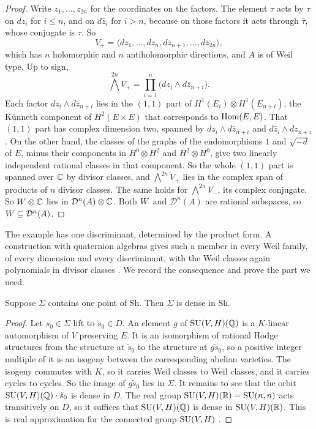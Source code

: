 \begin{proof}
Write $z_{1},\dots,z_{2n}$ for the coordinates on the factors. The element
$\tau$ acts by $\tau$ on $dz_{i}$ for $i\le n$, and on $d\bar z_{i}$ for
$i>n$, because on those factors it acts through $\bar\tau$, whose conjugate
is $\tau$. So
\[
  V_{+}=\langle dz_{1},\dots,dz_{n},d\bar z_{n+1},\dots,d\bar z_{2n}\rangle,
\]
which has $n$ holomorphic and $n$ antiholomorphic directions, and $A$ is of
Weil type. Up to sign,
\[
  \textstyle\bigwedge^{2n}V_{+}=\prod_{i=1}^{n}\bigl(dz_{i}\wedge d\bar z_{n+i}\bigr).
\]
Each factor $dz_{i}\wedge d\bar z_{n+i}$ lies in the $(1,1)$ part of
$H^{1}(E_{i})\otimes H^{1}(E_{n+i})$, the Künneth component of
$H^{2}(E\times E)$ that corresponds to $\operatorname{Hom}(E,E)$. That $(1,1)$ part has
complex dimension two, spanned by $dz_{i}\wedge d\bar z_{n+i}$ and
$d\bar z_{i}\wedge dz_{n+i}$. On the other hand, the classes of the graphs of
the endomorphisms $1$ and $\sqrt{-d}$ of $E$, minus their components in
$H^{0}\otimes H^{2}$ and $H^{2}\otimes H^{0}$, give two linearly independent
rational classes in that component. So the whole $(1,1)$ part is spanned
over $\mathbb{C}$ by divisor classes, and $\bigwedge^{2n}V_{+}$ lies in the
complex span of products of $n$ divisor classes. The same holds for
$\bigwedge^{2n}V_{-}$, its complex conjugate. So $W\otimes\mathbb{C}$ lies in
$\mathcal D^{n}(A)\otimes\mathbb{C}$. Both $W$ and $\mathcal D^{n}(A)$ are
rational subspaces, so $W\subseteq\mathcal D^{n}(A)$.
\end{proof}

The example has one discriminant, determined by the product form. A
construction with quaternion algebras gives such a member in every Weil
family, of every dimension and every discriminant, with the Weil classes
again polynomials in divisor classes \cite{BhH8}. We record the consequence
and prove the part we need.

\begin{proposition}\label{prop:densebook}
Suppose $\Sigma$ contains one point of $\mathrm{Sh}$. Then $\Sigma$ is dense
in $\mathrm{Sh}$.
\end{proposition}

\begin{proof}
Let $s_{0}\in\Sigma$ lift to $\tilde s_{0}\in D$. An element $g$ of
$\operatorname{SU}(V,H)(\mathbb{Q})$ is a $K$-linear automorphism of $V$ preserving $E$. It is an
isomorphism of rational Hodge structures from the structure at
$\tilde s_{0}$ to the structure at $g\tilde s_{0}$, so a positive integer
multiple of it is an isogeny between the corresponding abelian varieties.
The isogeny commutes with $K$, so it carries Weil classes to Weil classes,
and it carries cycles to cycles. So the image of $g\tilde s_{0}$ lies in
$\Sigma$. It remains to see that the orbit $\operatorname{SU}(V,H)(\mathbb{Q})\cdot\tilde s_{0}$
is dense in $D$. The real group $\operatorname{SU}(V,H)(\mathbb{R})=\operatorname{SU}(n,n)$ acts transitively
on $D$, so it suffices that $\operatorname{SU}(V,H)(\mathbb{Q})$ is dense in $\operatorname{SU}(V,H)(\mathbb{R})$. This
is real approximation for the connected group $\operatorname{SU}(V,H)$
\cite[Chapter~7]{PR94}.
\end{proof}

